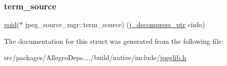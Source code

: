 \mbox{\label{structjpeg__source__mgr_aa1a163d908533a500d1b577b379309ad}} 
\subsubsection{\texorpdfstring{term\+\_\+source}{term\_source}}
{\footnotesize\ttfamily \hyperlink{png_8h_ac9c84fa68bbad002983e35ce3663c686}{void}($\ast$ jpeg\+\_\+source\+\_\+mgr\+::term\+\_\+source) (\hyperlink{jpeglib_8h_a00c7d78af44bd26a901c791ccfc1e178}{j\+\_\+decompress\+\_\+ptr} cinfo)}



The documentation for this struct was generated from the following file\+:\begin{DoxyCompactItemize}
\item 
src/packages/\+Allegro\+Deps..../build/native/include/\hyperlink{jpeglib_8h}{jpeglib.\+h}\end{DoxyCompactItemize}
